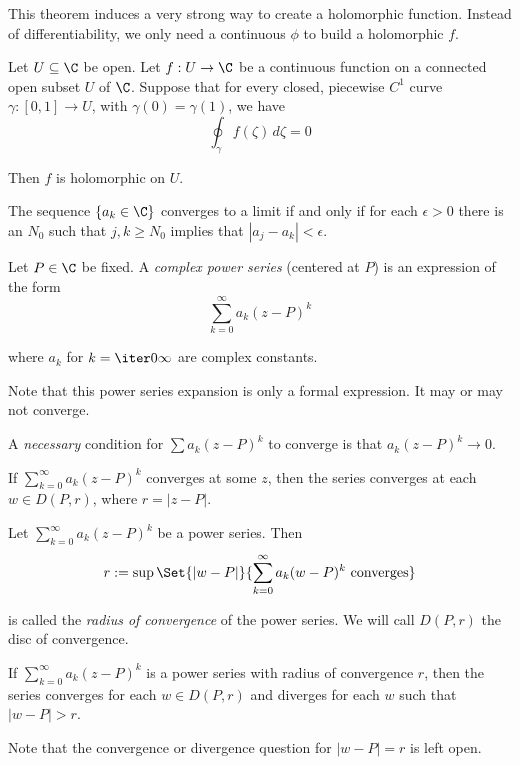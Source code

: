 This theorem induces a very strong way to create a holomorphic function.
Instead of differentiability, we only need a continuous $\phi$ to build a
holomorphic $f$.

\label{f378992}

Let $U\subseteq\C$ be open. Let $f:U\to\C$ be a continuous function on a
connected open subset $U$ of $\C$. Suppose that for every closed, piecewise
$C^1$ curve $\gamma:[0,1]\to U$, with $\gamma(0)=\gamma(1)$, we have
$$\oint_\gamma f(\zeta)\,d\zeta=0$$

Then $f$ is holomorphic on $U$.

\label{db44655}

The sequence $\{a_k\in\C\}$ converges to a limit if and only if for each
$\epsilon>0$ there is an $N_0$ such that $j,k\geq N_0$ implies that
$|a_j-a_k|<\epsilon$.

\label{b9a7c59}

Let $P\in\C$ be fixed. A \textit{complex power series} (centered at $P$) is an
expression of the form
$$
  \sum_{k=0}^\infty a_k(z-P)^k
$$

where $a_k$ for $k=\iter0\infty$ are complex constants.

Note that this power series expansion is only a formal expression. It may or
may not converge.

A \textit{necessary} condition for $\sum a_k(z-P)^k$ to converge is that
$a_k(z-P)^k\to0$.

\label{d5d5bdc}

If $\sum_{k=0}^\infty a_k(z-P)^k$ converges at some $z$, then the series
converges at each $w\in D(P,r)$, where $r=|z-P|$.

\label{da6e337}

Let $\sum_{k=0}^\infty a_k(z-P)^k$ be a power series. Then
$$
  r:=\sup\Set{|w-P|}{\sum_{k=0}^\infty a_k(w-P)^k\text{ converges}}
$$

is called the \textit{radius of convergence} of the power series. We will call
$D(P,r)$ the disc of convergence.

\label{c7d0e1d}

If $\sum_{k=0}^\infty a_k(z-P)^k$ is a power series with radius of convergence
$r$, then the series converges for each $w\in D(P,r)$ and diverges for each $w$
such that $|w-P|>r$.

Note that the convergence or divergence question for $|w-P|=r$ is left open.

